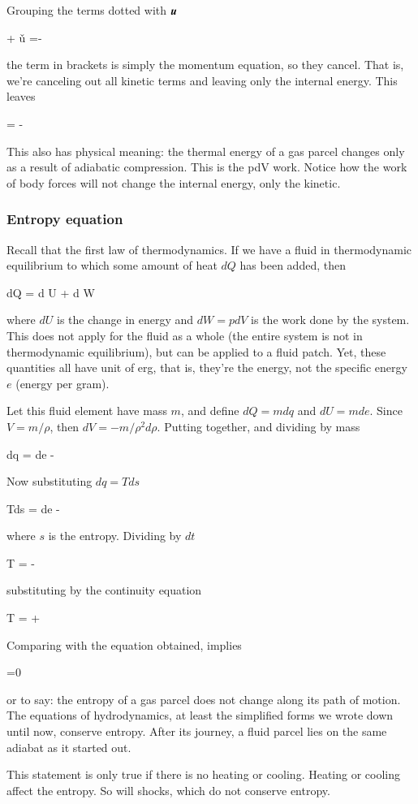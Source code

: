 Grouping the terms dotted with ${\boldsymbol{u}}$ 

\beq
{} + \v{u} \cdot {}=- 
\eeq

\noindent the term in brackets is simply the momentum equation, so they
cancel. That is, we're canceling out all kinetic terms and leaving
only the internal energy. This leaves


\beq
{} = - 
\eeq

This also has physical meaning: the thermal energy of a gas parcel changes only as a result of
adiabatic compression. This is the pdV work. Notice how the work of body forces
will not change the internal energy, only the kinetic. 

\subsubsection{Entropy equation}

Recall that the first law of thermodynamics. If we have a fluid in thermodynamic
equilibrium to which some amount of heat $dQ$ has been added, then

\beq
dQ = d U + d W
\label{eq:first-law-thermo-ext}
\eeq

\noindent where $dU$ is the change in energy and $dW=p dV$ is the work done
by the system. This does not apply for the fluid as a whole (the
entire system is not in thermodynamic equilibrium), but can be applied
to a fluid patch. Yet, these quantities all have unit of erg, that is, they're the
energy, not the specific energy $e$ (energy per gram). 

Let this fluid element have mass $ m$, and define $dQ =  m
dq$ and $dU = m de$. Since $V = m / \rho$, then
$dV=-m/\rho^2 d\rho$. Putting together, and dividing by mass 

\beq
dq = de -  \rho
\label{eq:first-law-thermo-int}
\eeq

\noindent Now substituting $dq=Tds$ 

\beq
Tds  = de -  \rho 
\eeq

\noindent where $s$ is the entropy. Dividing by $dt$

\beq
T  =  -  
\eeq

\noindent substituting by the continuity equation 

\beq
T  =  +  
\eeq

\noindent Comparing with the equation obtained, implies 

\beq
{}=0
\eeq

\noindent or to say: the entropy of a gas parcel does not change along
its path of motion. The equations of hydrodynamics, at least the
simplified forms we wrote down until now, conserve entropy.
After its journey, a fluid parcel lies on the same adiabat as it started out.

This statement is only true if there is no heating or cooling. Heating or cooling
affect the entropy. So will shocks, which do not conserve entropy.



